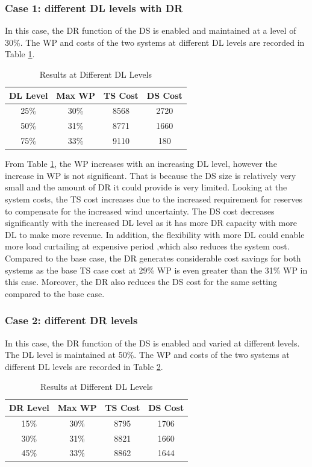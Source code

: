 \subsubsection{Case 1: different DL levels with DR}
In this case, the DR function of the DS is enabled and maintained at a level of 30\%. The WP and costs of the two systems at different DL levels are recorded in Table \ref{transbuse}.

\begin{table}[H]
\centering
\begin{tabular}{ |c|c|c|c| } 
 \hline
DL Level& Max WP & TS Cost & DS Cost \\ 
 \hline
25\% & 30\% & 8568 & 2720 \\ 
 \hline
50\% & 31\% & 8771 & 1660 \\ 
 \hline
75\% & 33\% & 9110 & 180 \\ 
 \hline
\end{tabular}
\caption{Results at Different DL Levels}
 \label{transbuse}
\end{table}

From Table \ref{transbuse}, the WP increases with an increasing DL level, however the increase in WP is not significant. That is because the DS size is relatively very small and the amount of DR it could provide is very limited. Looking at the system costs, the TS cost increases due to the increased requirement for reserves to compensate for the increased wind uncertainty. The DS cost decreases significantly with the increased DL level as it has more DR capacity with more DL to make more revenue. In addition, the flexibility with more DL could enable more load curtailing at expensive period ,which also reduces the system cost. Compared to the base case, the DR generates considerable cost savings for both systems as the base TS case cost at 29\% WP is even greater than the 31\% WP in this case. Moreover, the DR also reduces the DS cost for the same setting compared to the base case.

\subsubsection{Case 2: different DR levels}
In this case, the DR function of the DS is enabled and varied at different levels. The DL level is maintained at 50\%. The WP and costs of the two systems at different DL levels are recorded in Table \ref{transbusf}.

\begin{table}[H]
\centering
\begin{tabular}{ |c|c|c|c| } 
 \hline
DR Level & Max WP & TS Cost & DS Cost \\ 
 \hline
15\% & 30\% & 8795 & 1706 \\ 
 \hline
30\% & 31\% & 8821 & 1660 \\ 
 \hline
45\% & 33\% & 8862 & 1644 \\ 
 \hline
\end{tabular}
\caption{Results at Different DL Levels}
 \label{transbusf}
\end{table}

